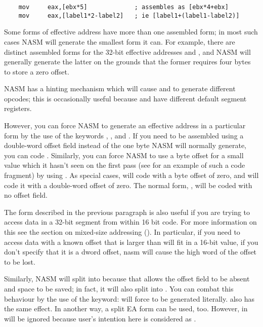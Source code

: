 \begin{lstlisting}
	mov     eax,[ebx*5]             ; assembles as [ebx*4+ebx]
	mov     eax,[label1*2-label2]   ; ie [label1+(label1-label2)]
\end{lstlisting}

Some forms of effective address have more than one assembled form;
in most such cases NASM will generate the smallest form it can. For
example, there are distinct assembled forms for the 32-bit effective
addresses \code{[eax*2+0]} and , and NASM will
generally generate the latter on the grounds that the former requires
four bytes to store a zero offset.

NASM has a hinting mechanism which will cause  and
 to generate different opcodes; this is occasionally
useful because  and  have different
default segment registers.

However, you can force NASM to generate an effective address in a
particular form by the use of the keywords , ,
 and . If you need \code{[eax+3]} to be
assembled using a double-word offset field instead of the one byte NASM
will normally generate, you can code . Similarly, you
can force NASM to use a byte offset for a small value which it hasn't seen
on the first pass (see  for an example of such a code
fragment) by using . As special cases, 
will code \code{[eax+0]} with a byte offset of zero, and 
will code it with a double-word offset of zero. The normal form, \code{[eax]},
will be coded with no offset field.

The form described in the previous paragraph is also useful if you
are trying to access data in a 32-bit segment from within 16 bit code.
For more information on this see the section on mixed-size addressing
(). In particular, if you need to access data with
a known offset that is larger than will fit in a 16-bit value, if you don't
specify that it is a dword offset, nasm will cause the high word of
the offset to be lost.

Similarly, NASM will split \code{[eax*2]} into  because
that allows the offset field to be absent and space to be saved; in fact,
it will also split  into .
You can combat this behaviour by the use of the  keyword:
 will force \code{[eax*2+0]} to be generated literally.
 also has the same effect. In another way, a split EA
form \code{[0, eax*2]} can be used, too. However,  in
 will be ignored because user's intention here
is considered as .

